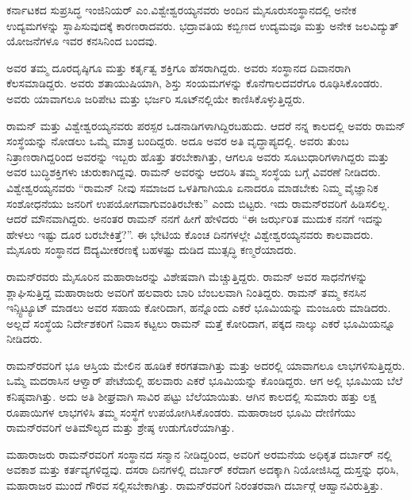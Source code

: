 
ಕರ್ನಾಟಕದ ಸುಪ್ರಸಿದ್ಧ ಇಂಜಿನಿಯರ್ ಎಂ.ವಿಶ್ವೇಶ್ವರಯ್ಯನವರು ಅಂದಿನ ಮೈಸೂರು\break ಸಂಸ್ಥಾನದಲ್ಲಿ ಅನೇಕ ಉದ್ಯಮಗಳನ್ನು ಸ್ಥಾಪಿಸುವುದಕ್ಕೆ ಕಾರಣರಾದವರು. ಭದ್ರಾವತಿಯ ಕಬ್ಬಿಣದ ಉದ್ಯಮವೂ ಮತ್ತು ಅನೇಕ ಜಲವಿದ್ಯುತ್ ಯೋಜನೆಗಳೂ ಇವರ ಕನಸಿನಿಂದ ಬಂದವು.

ಅವರ ತಮ್ಮ ದೂರದೃಷ್ಠಿಗೂ ಮತ್ತು ಕರ್ತೃತ್ವ ಶಕ್ತಿಗೂ ಹೆಸರಾಗಿದ್ದರು. ಅವರು ಸಂಸ್ಥಾನದ ದಿವಾನರಾಗಿ ಕೆಲಸಮಾಡಿದ್ದರು. ಅವರು ಶತಾಯುಷಿಯಾಗಿ, ಶಿಸ್ತು ಸಂಯಮಗಳನ್ನು ಕೊನೆಗಾಲದ\-ವರೆಗೂ ರೂಢಿಸಿಕೊಂಡರು. ಅವರು ಯಾವಾಗಲೂ ಜರಿಪೇಟ ಮತ್ತು ಭರ್ಜರಿ ಸೂಟ್‍ನಲ್ಲಿಯೇ ಕಾಣಿಸಿಕೊಳ್ಳುತ್ತಿದ್ದರು.

ರಾಮನ್ ಮತ್ತು ವಿಶ್ವೇಶ್ವರಯ್ಯನವರು ಪರಸ್ಪರ ಒಡನಾಡಿಗಳಾಗಿದ್ದಿರಬಹುದು. ಆದರೆ ನನ್ನ ಕಾಲದಲ್ಲಿ ಅವರು ರಾಮನ್ ಸಂಸ್ಥೆಯನ್ನು ನೋಡಲು ಒಮ್ಮೆ ಮಾತ್ರ ಬಂದಿದ್ದರು. ಅದೂ ಅವರ ಅತಿ ವೃದ್ಧಾಪ್ಯದಲ್ಲಿ. ಅವರು ತುಂಬ ನಿತ್ರಾಣರಾಗಿದ್ದರಿಂದ ಅವರನ್ನು ಇಬ್ಬರು ಹೊತ್ತು ತರಬೇಕಾಗಿತ್ತು, ಆಗಲೂ ಅವರು ಸೂಟುಧಾರಿಗಳಾಗಿದ್ದರು ಮತ್ತು ಅವರ ಬುದ್ಧಿಶಕ್ತಿಗಳು ಚುರುಕಾಗಿದ್ದವು. ರಾಮನ್ ಅವರನ್ನು ಆದರಿಸಿ ತಮ್ಮ ಸಂಸ್ಥೆಯ ಬಗ್ಗೆ ವಿವರಣೆ ನೀಡಿದರು. ವಿಶ್ವೇಶ್ವರಯ್ಯನವರು\enginline{-} “ರಾಮನ್ ನೀವು ಸಮಾಜದ ಒಳತಿಗಾಗಿಯೂ ಏನಾದರೂ ಮಾಡಬೇಕು ನಿಮ್ಮ ವೈಜ್ಞಾನಿಕ ಸಂಶೋಧನೆಯು ಜನರಿಗೆ ಉಪಯೋಗವಾಗುವಂತಿರಬೇಕು” ಎಂದು ಬಿಟ್ಟರು. ಇದು ರಾಮನ್‍ರವರಿಗೆ ಹಿಡಿಸಲಿಲ್ಲ. ಆದರೆ ಮೌನವಾಗಿದ್ದರು. ಅನಂತರ ರಾಮನ್ ನನಗೆ ಹೀಗೆ ಹೇಳಿದರು\enginline{-} “ಈ ಜರ್ಝರಿತ ಮುದುಕ ನನಗೆ ಇದನ್ನು ಹೇಳಲು ಇಷ್ಟು ದೂರ ಬರಬೇಕಿತ್ತೆ?”. ಈ ಭೇಟಿಯ ಕೊಂಚ ದಿನಗಳಲ್ಲೇ ವಿಶ್ವೇಶ್ವರಯ್ಯನವರು ಕಾಲವಾದರು. ಮೈಸೂರು ಸಂಸ್ಥಾನದ ಔದ್ಯಮೀಕರಣಕ್ಕೆ ಬಹಳಷ್ಟು ದುಡಿದ ಮುತ್ಸದ್ಧಿ ಕಣ್ಮರೆಯಾದರು.

\newpage


ರಾಮನ್‍ರವರು ಮೈಸೂರಿನ ಮಹಾರಾಜರನ್ನು ವಿಶೇಷವಾಗಿ ಮೆಚ್ಚುತ್ತಿದ್ದರು. ರಾಮನ್ ಅವರ ಸಾಧನೆಗಳನ್ನು ಶ್ಲಾಘಿಸುತ್ತಿದ್ದ ಮಹಾರಾಜರು ಅವರಿಗೆ ಹಲವಾರು ಬಾರಿ ಬೆಂಬಲವಾಗಿ ನಿಂತಿದ್ದರು. ರಾಮನ್ ತಮ್ಮ ಕನಸಿನ ಇನ್ಸ್ಟಿಟ್ಯೂಟ್ ಮಾಡಲು ಅವರ ಸಹಾಯ ಕೋರಿದಾಗ, ಹನ್ನೊಂದು ಎಕರೆ ಭೂಮಿಯನ್ನು ಮಂಜೂರು ಮಾಡಿದರು. ಅಲ್ಲದೆ ಸಂಸ್ಥೆಯ ನಿರ್ದೇಶಕರಿಗೆ ನಿವಾಸ ಕಟ್ಟಲು ರಾಮನ್ ಮತ್ತೆ ಕೋರಿದಾಗ, ಪಕ್ಕದ ನಾಲ್ಕು ಎಕರೆ ಭೂಮಿಯನ್ನೂ ನೀಡಿದರು.

ರಾಮನ್‍ರವರಿಗೆ ಭೂ ಆಸ್ತಿಯ ಮೇಲಿನ ಹೂಡಿಕೆ ಕರಗತವಾಗಿತ್ತು ಮತ್ತು ಅದರಲ್ಲಿ ಯಾವಾಗಲೂ ಲಾಭಗಳಿಸುತ್ತಿದ್ದರು. ಒಮ್ಮೆ ಮದರಾಸಿನ ಆಳ್ವಾರ್ ಪೇಟೆಯಲ್ಲಿ ಹಲವಾರು ಎಕರೆ ಭೂಮಿಯನ್ನು ಕೊಂಡಿದ್ದರು. ಆಗ ಅಲ್ಲಿ ಭೂಮಿಯ ಬೆಲೆ ಕನಿಷ್ಠವಾಗಿತ್ತು. ಅದು ಅತಿ ಶೀಘ್ರವಾಗಿ ಸಾವಿರ ಪಟ್ಟು ಬೆಲೆಯಾಯಿತು. ಆಗಿನ ಕಾಲದಲ್ಲಿ ಸುಮಾರು ಹತ್ತು ಲಕ್ಷ ರೂಪಾಯಿಗಳ ಲಾಭಗಳಿಸಿ ತಮ್ಮ ಸಂಸ್ಥೆಗೆ ಉಪಯೋಗಿಸಿಕೊಂಡರು. ಮಹಾರಾಜರ ಭೂಮಿ ದೇಣಿಗೆಯು ರಾಮನ್‍ರವರಿಗೆ ಅತಿಮೌಲ್ಯದ ಮತ್ತು ಶ್ರೇಷ್ಠ ಉಡುಗೊರೆಯಾಗಿತ್ತು.

ಮಹಾರಾಜರು ರಾಮನ್‍ರವರಿಗೆ ಸಂಸ್ಥಾನದ ಸನ್ಮಾನ ನೀಡಿದ್ದರಿಂದ, ಅವರಿಗೆ ಅರಮನೆಯ ಅಧಿಕೃತ ದರ್ಬಾರ್ ನಲ್ಲಿ ಅವಕಾಶ ಮತ್ತು ಕರ್ತವ್ಯಗಳಿದ್ದವು. ದಸರಾ ದಿನಗಳಲ್ಲಿ ದರ್ಬಾರ್ ಕರೆದಾಗ ಅದಕ್ಕಾಗಿ ನಿಯೋಜಿಸಿದ್ದ ದುಸ್ತನ್ನು ಧರಿಸಿ, ಮಹಾರಾಜರ ಮುಂದೆ ಗೌರವ ಸಲ್ಲಿಸಬೇಕಾಗಿತ್ತು. ರಾಮನ್‍ರವರಿಗೆ ನಿರಂತರವಾಗಿ ದರ್ಬಾರ್‍ಗೆ ಆಹ್ವಾನವಿರುತ್ತಿತ್ತು.

